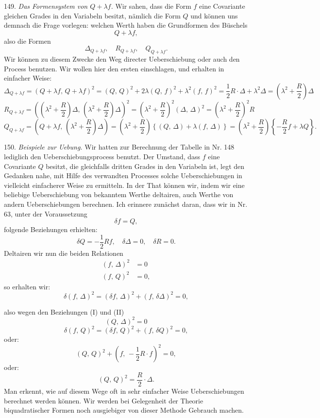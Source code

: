 \documentclass[11pt]{article}
\providecommand{\gesperrt}[1]{\textls[130]{#1}}
\providecommand{\weberpage}[1]{}
\providecommand{\weq}[2]{\begin{equation}\tag{#1}#2\end{equation}}
\let\Delta\varDelta
\begin{document}
149. \textit{Das Formensystem von $Q + \lambda f$.} Wir sahen, dass die Form $f$ eine Covariante gleichen Grades in den Variabeln besitzt, nämlich die Form $Q$ und können uns demnach die Frage vorlegen: welchen Werth haben die Grundformen des Büschels
\[
Q + \lambda f,
\]
also die Formen
\[
\Delta_{Q+\lambda f}, \quad R_{Q+\lambda f}, \quad Q_{Q+\lambda f}.
\]
Wir können zu diesem Zwecke den Weg directer Ueberschiebung oder auch den \gesperrt{Aronhold'schen} Process benutzen. Wir wollen hier den ersten einschlagen, und erhalten in einfacher Weise:
\weq{1}{\Delta_{Q+\lambda f} = (Q+\lambda f,\, Q+\lambda f)^2 = (Q,\,Q)^2 + 2\lambda(Q,\,f)^2 + \lambda^2(f,\,f)^2 = \frac{1}{2}R\cdot\Delta + \lambda^2\Delta = \left(\lambda^2 + \frac{R}{2}\right)\Delta}
\weq{2}{R_{Q+\lambda f} = \left(\left(\lambda^2+\frac{R}{2}\right)\Delta,\, \left(\lambda^2+\frac{R}{2}\right)\Delta\right)^2 = \left(\lambda^2+\frac{R}{2}\right)^2(\Delta,\,\Delta)^2 = \left(\lambda^2+\frac{R}{2}\right)^2 R}
\weq{3}{Q_{Q+\lambda f} = \left(Q+\lambda f,\, \left(\lambda^2+\frac{R}{2}\right)\Delta\right) = \left(\lambda^2+\frac{R}{2}\right)\left\{(Q,\,\Delta) + \lambda(f,\,\Delta)\right\} = \left(\lambda^2+\frac{R}{2}\right)\left\{-\frac{R}{2}f + \lambda Q\right\}.}

150. \textit{Beispiele zur Uebung.} Wir hatten zur Berechnung der Tabelle in Nr. 148 lediglich den Ueberschiebungsprocess benutzt. Der Umstand, dass $f$ eine Covariante $Q$ besitzt, die gleichfalls dritten Grades in den Variabeln ist, legt den Gedanken nahe, mit Hilfe des verwandten \gesperrt{Aronhold'schen} Processes solche Ueberschiebungen in vielleicht einfacherer Weise zu ermitteln. In der That können wir, indem wir eine beliebige Ueberschiebung von bekanntem Werthe deltairen, auch Werthe von andern Ueberschiebungen berechnen. Ich erinnere zunächst daran, dass wir in Nr. 63, unter der Voraussetzung
\weq{I}{\delta f = Q,}
folgende Beziehungen erhielten:
\weq{II}{\delta Q = -\frac{1}{2}Rf, \quad \delta\Delta = 0, \quad \delta R = 0.}
Deltairen wir nun die beiden Relationen
\[
\begin{aligned}
(f,\,\Delta)^2 &= 0\\
(f,\,Q)^2 &= 0,
\end{aligned}
\]
so erhalten wir:
\weq{1}{\delta(f,\,\Delta)^2 = (\delta f,\,\Delta)^2 + (f,\,\delta\Delta)^2 = 0,}


\weberpage{174}
also wegen den Beziehungen (I) und (II)
\[
(Q,\,\Delta)^2 = 0
\]
\weq{2}{\delta(f,\,Q)^2 = (\delta f,\,Q)^2 + (f,\,\delta Q)^2 = 0,}
oder:
\[
(Q,\,Q)^2 + \left(f,\,-\frac{1}{2}R\cdot f\right)^2 = 0,
\]
oder:
\[
(Q,\,Q)^2 = \frac{R}{2}\cdot\Delta.
\]
Man erkennt, wie auf diesem Wege oft in sehr einfacher Weise Ueberschiebungen berechnet werden können. Wir werden bei Gelegenheit der Theorie biquadratischer Formen noch ausgiebiger von dieser Methode Gebrauch machen.
\end{document}
